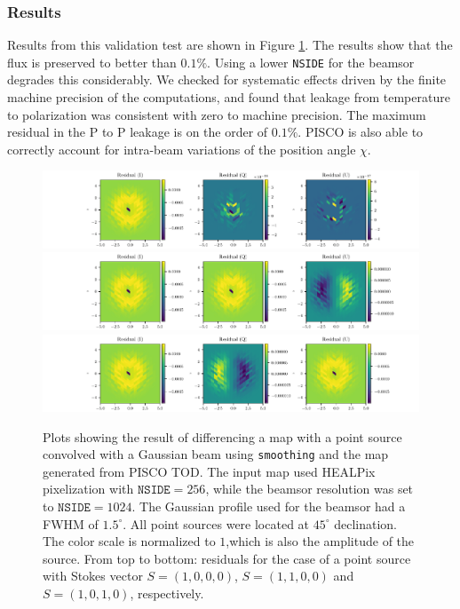 \documentclass[a4paper,11pt]{article}
\begin{document}
\subsubsection{Results}

Results from this validation test are shown in Figure \ref{fig::stokesqsource256beam1024dec45}. The results show that the flux is preserved to better than $0.1\%$. Using a lower \texttt{NSIDE} for the beamsor degrades this considerably. We checked for systematic effects driven by the finite machine precision of the computations, and found that leakage from temperature to polarization was consistent with zero to machine precision. The maximum residual in the P to P leakage is on the order of $0.1\%$. PISCO is also able to correctly account for intra-beam variations of the position angle $\chi$.

\begin{figure}
	\centering
	\includegraphics[width=1.0\linewidth]{figures/figure5_3rd_I.pdf}
	\includegraphics[width=1.0\linewidth]{figures/figure5_3rd_Q.pdf}
	\includegraphics[width=1.0\linewidth]{figures/figure5_3rd_U.pdf}
	\caption{Plots showing the result of differencing a map with a point source convolved with a Gaussian beam using \texttt{smoothing} and the map generated from PISCO TOD. The input map used HEALPix pixelization with $\mathrm{\texttt{NSIDE}} = 256$, while the beamsor resolution was set to $\mathrm{\texttt{NSIDE}} = 1024$. The Gaussian profile used for the beamsor had a FWHM of $1.5^\circ$. All point sources were located at $45^\circ$ declination. The color scale is normalized to $1$,which is also the amplitude of the source. From top to bottom: residuals for the case of a point source with Stokes vector $S = (1,0,0,0)$, $S=(1,1,0,0)$ and $S=(1,0,1,0)$, respectively.}
	\label{fig::stokesqsource256beam1024dec45}
\end{figure}
\end{document}
